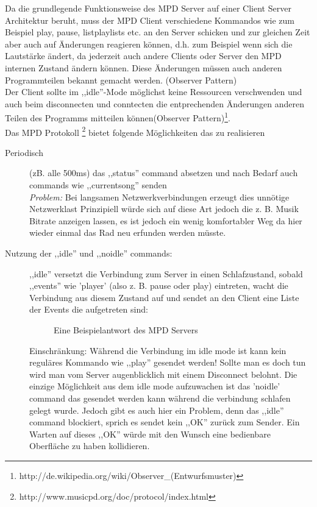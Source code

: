 Da die grundlegende Funktionsweise des MPD Server auf einer Client Server Architektur beruht, muss der MPD Client
verschiedene Kommandos wie zum Beispiel play, pause, listplaylists etc. an den Server schicken
und zur gleichen Zeit aber auch auf Änderungen reagieren können, d.h. zum Beispiel wenn sich die Lautstärke ändert,
da jederzeit auch andere Clients oder Server den MPD internen Zustand ändern können.
Diese Änderungen müssen auch anderen Programmteilen bekannt gemacht werden. (Observer Pattern)
\\
Der Client sollte im ,,idle''-Mode möglichst keine Ressourcen verschwenden und auch beim 
disconnecten und conntecten die entprechenden Änderungen anderen Teilen des Programms mitteilen
können(Observer Pattern)\footnote{http://de.wikipedia.org/wiki/Observer\_(Entwurfsmuster)}. 
\\

Das MPD Protokoll \footnote{http://www.musicpd.org/doc/protocol/index.html} bietet folgende Möglichkeiten das zu realisieren
\begin{description}
    \item [Periodisch] (zB. alle 500ms) das ,,status'' command absetzen und nach Bedarf auch commands wie ,,currentsong''
        senden
        \\
        \emph{Problem:} Bei langsamen Netzwerkverbindungen erzeugt dies unnötige Netzwerklast 
        Prinzipiell würde sich auf diese Art jedoch die z. B. Musik Bitrate anzeigen lassen, es ist jedoch ein
        wenig komfortabler Weg da hier wieder einmal das Rad neu erfunden werden müsste.
    \item [Nutzung der ,,idle'' und ,,noidle'' commands:]
        ,,idle'' versetzt die Verbindung zum Server in einen Schlafzustand, sobald ,,events'' wie 'player' (also z. B. pause oder play) 
        eintreten, wacht die Verbindung aus diesem Zustand auf und sendet an den Client eine Liste der Events die aufgetreten sind:

\begin{figure}[h!]
    
\caption{Eine Beispielantwort des MPD Servers}
\label{dd_state}
\end{figure}

        Einschränkung: Während die Verbindung im idle mode ist kann kein reguläres Kommando wie ,,play'' gesendet werden!
        Sollte man es doch tun wird man vom Server augenblicklich mit einem Disconnect belohnt.
        Die einzige Möglichkeit aus dem idle mode aufzuwachen ist das 'noidle' command das gesendet werden
        kann während die verbindung schlafen gelegt wurde.
        Jedoch gibt es auch hier ein Problem, denn das ,,idle'' command blockiert, sprich es sendet kein ,,OK'' zurück zum Sender.
        Ein Warten auf dieses ,,OK'' würde mit den Wunsch eine bedienbare Oberfläche zu haben kollidieren.
\end{description}

